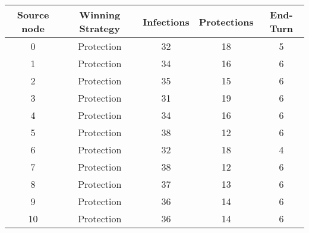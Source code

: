 \documentclass[results.tex]{subfiles}
\begin{document}
    \begin{center}
        \begin{tabular}{| c || c | c | c | c |}
            \hline
            {\bfseries Source node} & {\bfseries Winning Strategy} & {\bfseries Infections} & {\bfseries Protections}
            & {\bfseries End-Turn}
            \\  %
            \hline\hline
            0                       & Protection                   & 32                     & 18                      & 5                    \\
            \hline
            1                       & Protection                   & 34                     & 16                      & 6                    \\
            \hline
            2                       & Protection                   & 35                     & 15                      & 6                    \\
            \hline
            3                       & Protection                   & 31                     & 19                      & 6                    \\
            \hline
            4                       & Protection                   & 34                     & 16                      & 6                    \\
            \hline
            5                       & Protection                   & 38                     & 12                      & 6                    \\
            \hline
            6                       & Protection                   & 32                     & 18                      & 4                    \\
            \hline
            7                       & Protection                   & 38                     & 12                      & 6                    \\
            \hline
            8                       & Protection                   & 37                     & 13                      & 6                    \\
            \hline
            9                       & Protection                   & 36                     & 14                      & 6                    \\
            \hline
            10                      & Protection                   & 36                     & 14                      & 6                    \\

\end{tabular}
\end{center}
\end{document}
